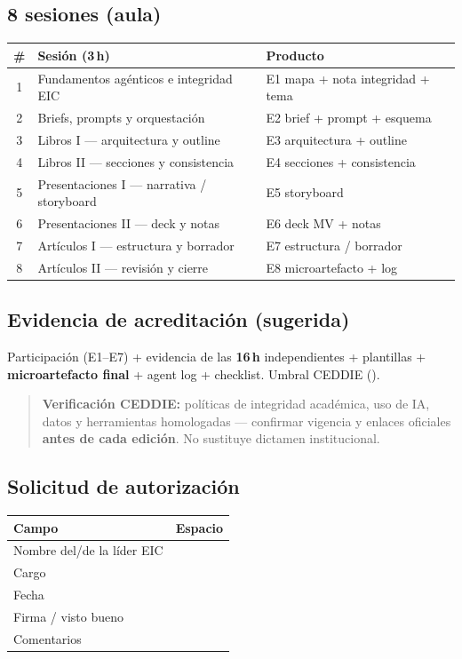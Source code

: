 \subsection*{8 sesiones (aula)}
\begin{tabularx}{\textwidth}{@{}cXl@{}}
\toprule
\# & Sesión (3\,h) & Producto \\
\midrule
1 & Fundamentos agénticos e integridad EIC & E1 mapa + nota integridad + tema \\
2 & Briefs, prompts y orquestación & E2 brief + prompt + esquema \\
3 & Libros I --- arquitectura y outline & E3 arquitectura + outline \\
4 & Libros II --- secciones y consistencia & E4 secciones + consistencia \\
5 & Presentaciones I --- narrativa / storyboard & E5 storyboard \\
6 & Presentaciones II --- deck y notas & E6 deck MV + notas \\
7 & Artículos I --- estructura y borrador & E7 estructura / borrador \\
8 & Artículos II --- revisión y cierre & E8 microartefacto + log \\
\bottomrule
\end{tabularx}

\subsection*{Evidencia de acreditación (sugerida)}
Participación (E1--E7) + evidencia de las \textbf{16\,h} independientes + plantillas + \textbf{microartefacto final} + agent log + checklist. Umbral CEDDIE (\ceddie).

\begin{quote}
\textbf{Verificación CEDDIE:} políticas de integridad académica, uso de IA, datos y herramientas homologadas --- confirmar vigencia y enlaces oficiales \textbf{antes de cada edición}. No sustituye dictamen institucional.
\end{quote}

\subsection*{Solicitud de autorización}
\begin{tabularx}{\textwidth}{@{}lX@{}}
\toprule
Campo & Espacio \\
\midrule
Nombre del/de la líder EIC & \hrulefill \\
Cargo & \hrulefill \\
Fecha & \hrulefill \\
Firma / visto bueno & \hrulefill \\
Comentarios & \hrulefill \\
\bottomrule
\end{tabularx}
